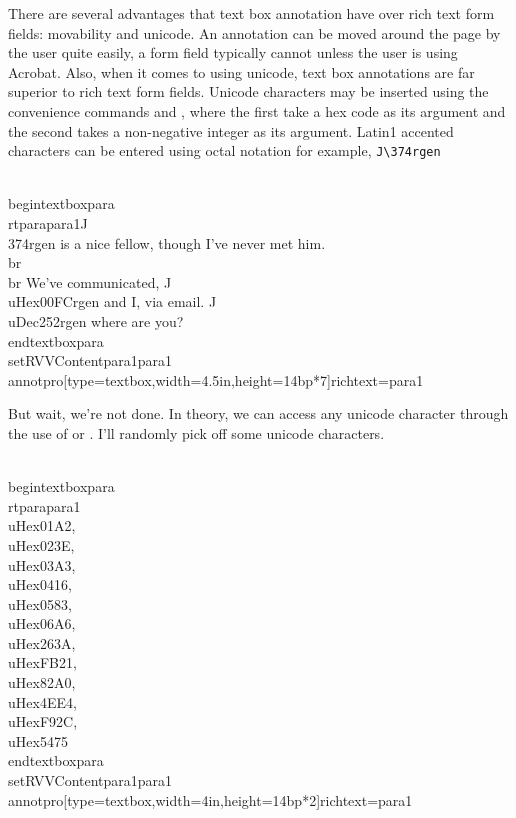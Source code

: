 \documentclass[12pt]{article}
\makeatletter
\let\app\textsf
\renewenvironment{quote}[1][]
   {\def\@rgi{#1}\ifx\@rgi\@empty
    \let\rghtm\@empty\else\def\rghtm{\rightmargin\leftmargin}\fi
    \list{}{\rghtm} %
    \item\relax}
   {\endlist}
\makeatother
\begin{document}
There are several advantages that text box annotation have over rich text
form fields: movability and unicode. An annotation can be moved around the
page by the user quite easily, a form field typically cannot unless the user
is using \app{Acrobat}. Also, when it comes to using unicode, text box
annotations are far superior to rich text form fields. Unicode characters may
be inserted using the convenience commands  and , where the
first take a hex code as its argument and the second takes a non-negative
integer as its argument. Latin1 accented characters can be entered using octal notation
for example, \verb~J\374rgen~
\begin{defineJS}{\annotextboxi}
\\begin{textboxpara}
\\rtpara{para1}{J\\374rgen is a nice fellow, though I've never met him.\\br\\br
We've communicated, J\\uHex{00FC}rgen and I, via email. J\\uDec{252}rgen where are you?}
\\end{textboxpara}
\\setRVVContent{para1}{para1}
\\annotpro[type=textbox,width=4.5in,height=14bp*7]{richtext=para1}
\end{defineJS}
\begin{textboxpara}
\end{textboxpara}
\begin{quote}%
{}
%
\annotpro[margin,readonly,margintext={\centering The Code}]{\annotextboxi}%
\end{quote}
But wait, we're not done. In theory, we can access any unicode character through the use
of  or . I'll randomly pick off some unicode characters.
\begin{defineJS}{\annotextboxi}
\\begin{textboxpara}
\\rtpara{para1}{%
\\uHex{01A2}, \\uHex{023E}, \\uHex{03A3}, \\uHex{0416},
\\uHex{0583}, \\uHex{06A6}, \\uHex{263A}, \\uHex{FB21},
\\uHex{82A0}, \\uHex{4EE4}, \\uHex{F92C}, \\uHex{5475}}
\\end{textboxpara}
\\setRVVContent{para1}{para1}
\\annotpro[type=textbox,width=4in,height=14bp*2]{richtext=para1}
\end{defineJS}
\end{document}
